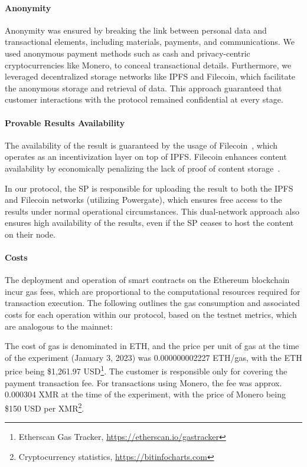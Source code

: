 \documentclass[pdftex,twocolumn,epjc3]{svjour3}
\begin{document}
\paragraph{Anonymity}
\begin{sloppypar}
Anonymity was ensured by breaking the link between personal data and transactional elements, including materials, payments, and communications. We used anonymous payment methods such as cash and privacy-centric cryptocurrencies like Monero, to conceal transactional details. Furthermore, we leveraged decentralized storage networks like IPFS and Filecoin, which facilitate the anonymous storage and retrieval of data. This approach guaranteed that customer interactions with the protocol remained confidential at every stage.
\end{sloppypar}

\paragraph{Provable Results Availability}\label{sec:provable-results-availability}
The availability of the result is guaranteed by the usage of Filecoin~\cite{protocollabsFilecoinDecentralizedStorage2017}, which operates as an incentivization layer on top of IPFS. Filecoin enhances content availability by economically penalizing the lack of proof of content storage~\cite{filecoinSlashing}.

In our protocol, the SP is responsible for uploading the result to both the IPFS and Filecoin networks (utilizing Powergate), which ensures free access to the results under normal operational circumstances. This dual-network approach also ensures high availability of the results, even if the SP ceases to host the content on their node.

\paragraph{Costs}
The deployment and operation of smart contracts on the Ethereum blockchain incur gas fees, which are proportional to the computational resources required for transaction execution. The following outlines the gas consumption and associated costs for each operation within our protocol, based on the testnet metrics, which are analogous to the mainnet:

The cost of gas is denominated in ETH, and the price per unit of gas at the time of the experiment (January 3, 2023) was 0.000000002227 ETH/gas, with the ETH price being \$1,261.97 USD\footnote{Etherscan Gas Tracker, \url{https://etherscan.io/gastracker}}. The customer is responsible only for covering the payment transaction fee. For transactions using Monero, the fee was approx. 0.000304 XMR at the time of the experiment, with the price of Monero being \$150 USD per XMR\footnote{Cryptocurrency statistics, \url{https://bitinfocharts.com}}.
\end{document}
